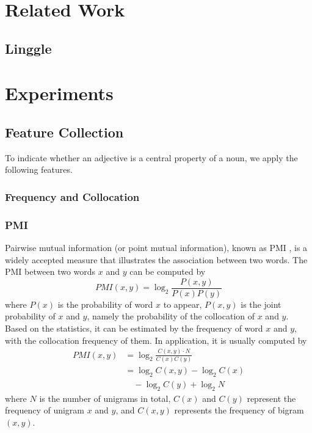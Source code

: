 \section{Related Work}
\subsection{Linggle}
\par


\section{Experiments}

\subsection{Feature Collection}
To indicate whether an adjective is a central property of a noun, we apply the following features.
\subsubsection{Frequency and Collocation}

\subsubsection{PMI}
Pairwise mutual information (or point mutual information), known as PMI \cite{church1990word, bouma2009normalized}, is a widely accepted measure that illustrates the association between two words. 
The PMI between two words $x$ and $y$ can be computed by 
\begin{equation}
PMI(x, y) = \log_2 \frac{P(x,y)}{P(x)P(y)}
\end{equation}
where $P(x)$ is the probability of word $x$ to appear, 
$P(x,y)$ is the joint probability of $x$ and $y$, namely the probability of the collocation of $x$ and $y$. 
Based on the statistics, it can be estimated by the frequency of word $x$ and $y$,  with the collocation frequency of them. 
In application, it is usually computed by 
\begin{equation}
\begin{aligned}
PMI(x,y) &= \log_2 \frac{C(x,y) \cdot N}{C(x)C(y)}  \\
 &= \log_2{C(x,y)} - \log_2{C(x)} \\ 
 & \quad - \log_2{C(y)} + \log_2 N
\end{aligned}
\end{equation}
where $N$ is the number of unigrams in total, 
$C(x)$ and $C(y)$ represent the frequency of unigram $x$ and $y$, 
and $C(x,y)$ represents the frequency of bigram $(x, y)$.

